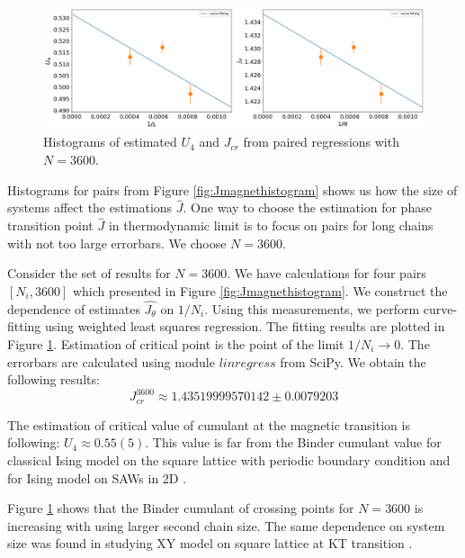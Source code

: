  \begin{figure}[!ht]
	\centering
	\includegraphics[scale=0.3628]{Images/criticalu4_4900.png}
	\caption{ Histograms of estimated $U_4$ and $J_{cr}$ from paired regressions with $N=3600$.  }
	\label{fig:JmagnetLinear}
\end{figure} 

Histograms for pairs from Figure \ref{fig:Jmagnethistogram} shows us how the size of systems affect the estimations $\hat{J}$. One way to choose the estimation for phase transition point $\hat{J}$ in thermodynamic limit is to focus on pairs for long chains with not too large errorbars. We choose $N=3600$. 

Consider the set of results for $N=3600$. We have calculations for four pairs $[N_i, 3600]$ which presented in Figure \ref{fig:Jmagnethistogram}. We construct the dependence of estimates $\hat{J_{\theta}}$ on $1/N_i$. Using this measurements, we perform curve-fitting using weighted least squares regression. The fitting results are plotted in Figure \ref{fig:JmagnetLinear}. Estimation of critical point is the point of the limit $1/N_i \rightarrow 0$. The errorbars are calculated using module $linregress$ from SciPy. We obtain the following results: 
\begin{equation}
\label{eq:critical_J_magnet_2D}
J_{cr}^{3600} \approx  1.43519999570142 \pm 0.0079203
\end{equation}

The estimation of critical value of cumulant at the magnetic transition is following: $U_4 \approx 0.55(5) $. This value is far from the Binder cumulant  value for classical Ising model on the square lattice with periodic boundary condition and for Ising model on SAWs in 2D \cite{PhysRevE.104.054501}. 

Figure  \ref{fig:JmagnetLinear} shows that the Binder cumulant of crossing  points for $N=3600$ is increasing with using larger second chain size. The same dependence on system size was found in studying XY model on square lattice at  KT transition \cite{Hasenbusch_2008}.   

